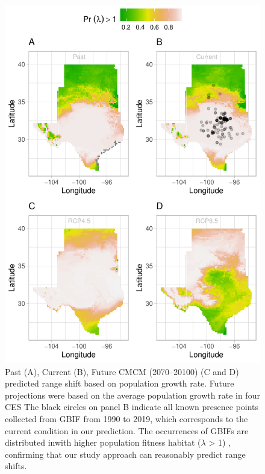\documentclass[12pt]{article}
\begin{document}
\begin{figure}[H]
  \begin{center}
    \includegraphics[width=0.78\linewidth]{Figures/Fig_geoPrlambdaprojection_ces.pdf}
  \caption{Past (A), Current (B), Future CMCM (2070–20100) (C and D) predicted range shift based on population growth rate. Future projections were based on the average population growth rate in four CES The black circles on panel B indicate all known presence points collected from GBIF from 1990 to 2019, which corresponds to the current condition in our prediction.  The occurrences of GBIFs are distributed inwith higher population fitness habitat ($\lambda$ > 1) , confirming that our study approach can reasonably predict range shifts. }
  \label{Sup:geoprojces}
  \end{center}
\end{figure}
\end{document}
